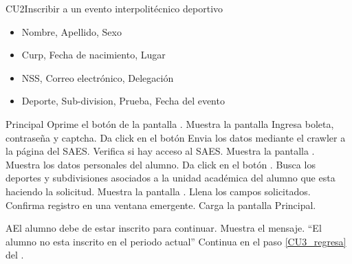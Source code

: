 \begin{UseCase}{CU2}{Inscribir a un evento interpolitécnico deportivo}
{\begin{itemize}
			\item Nombre, Apellido, Sexo
			\item Curp, Fecha de nacimiento, Lugar
			\item NSS, Correo electrónico, Delegación
			\item Deporte, Sub-division, Prueba, Fecha del evento
	\end{itemize}}
\end{UseCase}
\begin{UCtrayectoria}{Principal}
	\UCpaso[\UCactor] Oprime el botón  de la pantalla .\label{CU3_inicio}
	\UCpaso Muestra la pantalla \label{CU3_regresa}
	\UCpaso[\UCactor] Ingresa boleta, contraseña y captcha.
	\UCpaso[\UCactor] Da click en el botón 
	\UCpaso Envia los datos mediante el crawler a la página del SAES.
	\UCpaso Verifica si hay acceso al SAES.  
	\UCpaso Muestra la pantalla .
	\UCpaso Muestra los datos personales del alumno.
	\UCpaso[\UCactor] Da click en el botón . 
	\UCpaso Busca los deportes y subdivisiones asociados a la unidad académica del alumno que esta haciendo la solicitud.
	\UCpaso Muestra la pantalla . \label{CU3_deporte}
	\UCpaso[\UCactor] Llena los campos solicitados. 
	\UCpaso Confirma registro en una ventana emergente.
	\UCpaso Carga la pantalla Principal.
\end{UCtrayectoria}

\begin{UCtrayectoriaA}{A}{El alumno debe de estar inscrito para continuar.}
	\UCpaso Muestra el mensaje. “El alumno no esta inscrito en el periodo actual”
	\UCpaso Continua en el paso \ref{CU3_regresa} del .
\end{UCtrayectoriaA}

